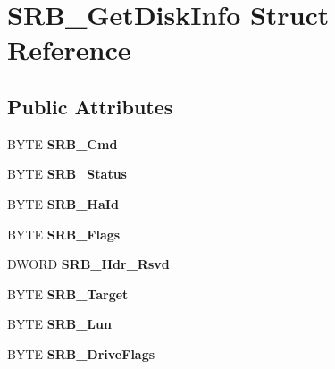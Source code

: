 \hypertarget{structSRB__GetDiskInfo}{\section{S\-R\-B\-\_\-\-Get\-Disk\-Info Struct Reference}
\label{structSRB__GetDiskInfo}
}
\subsection*{Public Attributes}
\begin{DoxyCompactItemize}
\item 
\hypertarget{structSRB__GetDiskInfo_a3c00a972a63d515a1b1d197f029043f2}{B\-Y\-T\-E {\bfseries S\-R\-B\-\_\-\-Cmd}}\label{structSRB__GetDiskInfo_a3c00a972a63d515a1b1d197f029043f2}

\item 
\hypertarget{structSRB__GetDiskInfo_a824af1e5c212898bf10ba514de733012}{B\-Y\-T\-E {\bfseries S\-R\-B\-\_\-\-Status}}\label{structSRB__GetDiskInfo_a824af1e5c212898bf10ba514de733012}

\item 
\hypertarget{structSRB__GetDiskInfo_afe4a2ec357715175f23b5401daffd91a}{B\-Y\-T\-E {\bfseries S\-R\-B\-\_\-\-Ha\-Id}}\label{structSRB__GetDiskInfo_afe4a2ec357715175f23b5401daffd91a}

\item 
\hypertarget{structSRB__GetDiskInfo_ab925b527182ea42c2083cb0c668cb78a}{B\-Y\-T\-E {\bfseries S\-R\-B\-\_\-\-Flags}}\label{structSRB__GetDiskInfo_ab925b527182ea42c2083cb0c668cb78a}

\item 
\hypertarget{structSRB__GetDiskInfo_a2b0311d4e5ca0177be189afecdfde335}{D\-W\-O\-R\-D {\bfseries S\-R\-B\-\_\-\-Hdr\-\_\-\-Rsvd}}\label{structSRB__GetDiskInfo_a2b0311d4e5ca0177be189afecdfde335}

\item 
\hypertarget{structSRB__GetDiskInfo_a0a307f420928ecacea5b49f2991b9196}{B\-Y\-T\-E {\bfseries S\-R\-B\-\_\-\-Target}}\label{structSRB__GetDiskInfo_a0a307f420928ecacea5b49f2991b9196}

\item 
\hypertarget{structSRB__GetDiskInfo_a40031f3bda423e41241818f14c29f7d6}{B\-Y\-T\-E {\bfseries S\-R\-B\-\_\-\-Lun}}\label{structSRB__GetDiskInfo_a40031f3bda423e41241818f14c29f7d6}

\item 
\hypertarget{structSRB__GetDiskInfo_a2eeafeadef21d97b42aad1af6e8b8926}{B\-Y\-T\-E {\bfseries S\-R\-B\-\_\-\-Drive\-Flags}}\label{structSRB__GetDiskInfo_a2eeafeadef21d97b42aad1af6e8b8926}


\end{DoxyCompactItemize}
